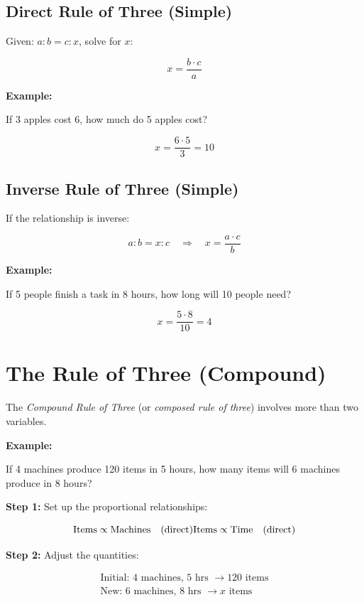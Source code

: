 \subsection{Direct Rule of Three (Simple)}

Given: \(a : b = c : x\), solve for \(x\):

\[
    x = \frac{b \cdot c}{a}
\]

\textbf{Example:}

If 3 apples cost 6, how much do 5 apples cost?

\[
    x = \frac{6 \cdot 5}{3} = 10
\]

\subsection{Inverse Rule of Three (Simple)}

If the relationship is inverse:

\[
    a : b = x : c \quad \Rightarrow \quad x = \frac{a \cdot c}{b}
\]

\textbf{Example:}

If 5 people finish a task in 8 hours, how long will 10 people need?

\[
    x = \frac{5 \cdot 8}{10} = 4
\]

\section{The Rule of Three (Compound)}

The \emph{Compound Rule of Three} (or \emph{composed rule of three}) involves more than two variables.

\textbf{Example:}

If 4 machines produce 120 items in 5 hours, how many items will 6 machines produce in 8 hours?

\textbf{Step 1:} Set up the proportional relationships:

\[
    \text{Items} \propto \text{Machines} \quad (\text{direct}) \\
    \text{Items} \propto \text{Time} \quad (\text{direct})
\]

\textbf{Step 2:} Adjust the quantities:

\begin{align*}
    \text{Initial: } 4 \text{ machines, } 5 \text{ hrs } \rightarrow 120 \text{ items} \\
    \text{New: } 6 \text{ machines, } 8 \text{ hrs } \rightarrow x \text{ items}
\end{align*}

